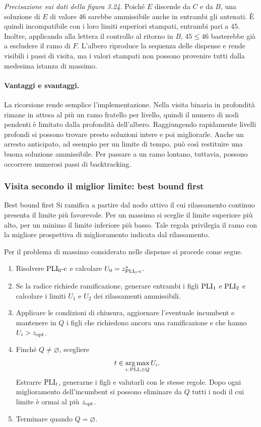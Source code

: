 \emph{Precisazione sui dati della figura 3.24.}
Poiché $E$ discende da $C$ e da $B$, una soluzione di $E$ di valore
$46$ sarebbe ammissibile anche in entrambi gli antenati. È quindi
incompatibile con i loro limiti superiori stampati, entrambi pari a $45$.
Inoltre, applicando alla lettera il controllo al ritorno in $B$,
$45\leq46$ basterebbe già a escludere il ramo di $F$. L'albero riproduce
la sequenza delle dispense e rende visibili i passi di visita, ma i valori
stampati non possono provenire tutti dalla medesima istanza di massimo.

\paragraph{Vantaggi e svantaggi.}
La ricorsione rende semplice l'implementazione. Nella visita binaria in
profondità rimane in attesa al più un ramo fratello per livello, quindi
il numero di nodi pendenti è limitato dalla profondità dell'albero.
Raggiungendo rapidamente livelli profondi si possono trovare presto
soluzioni intere e poi migliorarle. Anche un arresto anticipato, ad esempio
per un limite di tempo, può così restituire una buona soluzione ammissibile.
Per passare a un ramo lontano, tuttavia, possono occorrere numerosi passi
di backtracking.

\subsubsection{Visita secondo il miglior limite: best bound first}

\begin{definition}{Best bound first}
Si ramifica a partire dal nodo attivo il cui rilassamento continuo
presenta il limite più favorevole. Per un massimo si sceglie il limite
superiore più alto, per un minimo il limite inferiore più basso. Tale
regola privilegia il ramo con la migliore prospettiva di miglioramento
indicata dal rilassamento.
\end{definition}

Per il problema di massimo considerato nelle dispense si procede come segue.
\begin{enumerate}
 \item Risolvere $\mathrm{PLI}_{0}\text{-c}$ e calcolare $U_0=z^*_{\mathrm{PLI}_{0}\text{-c}}$.
 \item Se la radice richiede ramificazione, generare entrambi i figli
       $\mathrm{PLI}_{1}$ e $\mathrm{PLI}_{2}$ e calcolare i limiti $U_1$ e $U_2$
       dei rilassamenti ammissibili.
 \item Applicare le condizioni di chiusura, aggiornare l'eventuale
       incumbent e mantenere in $Q$ i figli che richiedono ancora una
       ramificazione e che hanno $U_i>z_{\mathrm{opt}}$.
 \item Finché $Q\ne\varnothing$, scegliere
       \[
        t\in\operatorname*{arg\,max}_{i:\,\mathrm{PLI}_{i}\in Q} U_i.
       \]
       Estrarre $\mathrm{PLI}_{t}$, generarne i figli e valutarli con le stesse
       regole. Dopo ogni miglioramento dell'incumbent si possono eliminare
       da $Q$ tutti i nodi il cui limite è ormai al più $z_{\mathrm{opt}}$.
 \item Terminare quando $Q=\varnothing$.
\end{enumerate}

